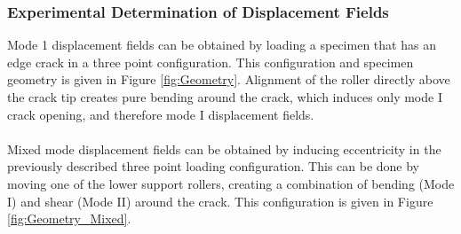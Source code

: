 \documentclass[12pt]{article}
\begin{document}
\subsubsection{Experimental Determination of Displacement Fields} %
Mode 1 displacement fields can be obtained by loading a specimen that has an edge crack in a three point configuration. This configuration and specimen geometry is given in Figure \ref{fig:Geometry}. Alignment of the roller directly above the crack tip creates pure bending around the crack, which induces only mode I crack opening, and therefore mode I displacement fields.
\\ \\
Mixed mode displacement fields can be obtained by inducing eccentricity in the previously described three point loading configuration. This can be done by moving one of the lower support rollers, creating a combination of bending (Mode I) and shear (Mode II) around the crack. This configuration is given in Figure \ref{fig:Geometry_Mixed}.  
\end{document}
